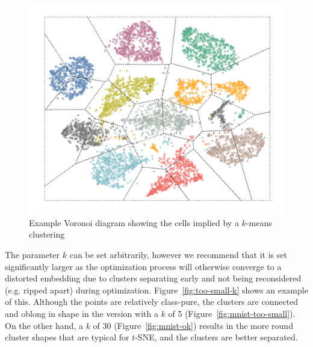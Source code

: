 \begin{figure}[!tbp]
  \centering
  \includegraphics[width=0.7\linewidth]{img/voronoi_optdigits}
  \caption{Example Voronoi diagram showing the cells implied by a $k$-means clustering}
  \label{fig:voronoi-optdigits}
\end{figure}

The parameter $k$ can be set arbitrarily, however we recommend that it is set
significantly larger as the optimization process will otherwise converge to
a distorted embedding due to clusters separating early and not being reconsidered (e.g. ripped apart)
during optimization. Figure~\ref{fig:too-small-k} shows an example of this. Although
the points are relatively class-pure, the clusters are connected and oblong in shape
in the version with a $k$ of 5 (Figure~\ref{fig:mnist-too-small}). On the other hand,
a $k$ of 30 (Figure~\ref{fig:mnist-ok}) results in the more round cluster shapes that are typical for $t$-SNE, and
the clusters are better separated.

